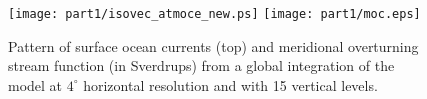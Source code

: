 \begin{figure}
\begin{center}
 \texttt{[image: part1/isovec\_atmoce\_new.ps]}
 \texttt{[image: part1/moc.eps]}
\end{center}
\caption{Pattern of surface ocean currents (top) and meridional
overturning stream function (in Sverdrups) from a global
integration of the model at $4^{\circ}$ horizontal resolution and with
15 vertical levels.}
\label{fig:large-scale-circ}
\end{figure}

